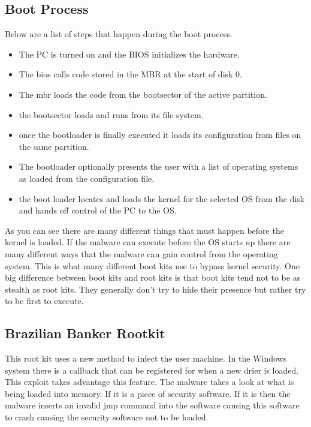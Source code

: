 \documentclass[letterpaper, onecolumn,10pt]{IEEEtran}
\begin{document}
		    \subsection{Boot Process}
		        Below are a list of steps that happen during the boot process.\\
		        \begin{itemize}
		            \item The PC is turned on and the BIOS initializes the hardware.\\
		            \item The bios calls code stored in the MBR at the start of disk 0.\\
		            \item The mbr loads the code from the bootsector of the active partition.\\
		            \item the bootsector loads and runs from its file system.\\
		            \item once the bootloader is finally executed it loads its configuration from files on the same partition.\\
		            \item The bootloader optionally presents the user with a list of operating systems as loaded from the configuration file.\\
		            \item the boot loader locates and loads the kernel for the selected OS from the disk and hands off control of the PC to the OS.\\
		        \end{itemize}
		        As you can see there are many different things that must happen before the kernel is loaded. If the malware can execute before the OS starts up there are many different ways that the malware can gain control from the operating system. This is what many different boot kits use to bypass kernel security. One big difference between boot kits and root kits is that boot kits tend not to be as stealth as root kits. They generally don't try to hide their presence but rather try to be first to execute.\\
		        
	        \subsection{Brazilian Banker Rootkit}
	        This root kit uses a new method to infect the user machine. In the Windows system there is a callback that can be registered for when a new drier is loaded. This exploit takes advantage this feature. The malware takes a look at what is being loaded into memory. If it is a piece of security software. If it is then the malware inserts an invalid jmp command into the software causing this software to crash causing the security software not to be loaded.\\
		    
		
\end{document}

